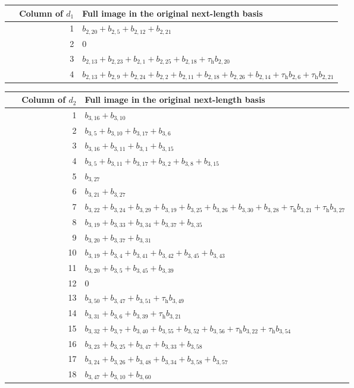 \begin{longtable}{r p{0.78\linewidth}}
Column of $d_1$ & Full image in the original next-length basis\\\hline
\endhead
1 & $b_{2,20} + b_{2,5} + b_{2,12} + b_{2,21}$\\
2 & $0$\\
3 & $b_{2,13} + b_{2,23} + b_{2,1} + b_{2,25} + b_{2,18} + \tau_{\mathrm h}b_{2,20}$\\
4 & $b_{2,13} + b_{2,9} + b_{2,24} + b_{2,2} + b_{2,11} + b_{2,18} + b_{2,26} + b_{2,14} + \tau_{\mathrm h}b_{2,6} + \tau_{\mathrm h}b_{2,21}$\\
\end{longtable}
\begin{longtable}{r p{0.78\linewidth}}
Column of $d_2$ & Full image in the original next-length basis\\\hline
\endhead
1 & $b_{3,16} + b_{3,10}$\\
2 & $b_{3,5} + b_{3,10} + b_{3,17} + b_{3,6}$\\
3 & $b_{3,16} + b_{3,11} + b_{3,1} + b_{3,15}$\\
4 & $b_{3,5} + b_{3,11} + b_{3,17} + b_{3,2} + b_{3,8} + b_{3,15}$\\
5 & $b_{3,27}$\\
6 & $b_{3,21} + b_{3,27}$\\
7 & $b_{3,22} + b_{3,24} + b_{3,29} + b_{3,19} + b_{3,25} + b_{3,26} + b_{3,30} + b_{3,28} + \tau_{\mathrm h}b_{3,21} + \tau_{\mathrm h}b_{3,27}$\\
8 & $b_{3,19} + b_{3,33} + b_{3,34} + b_{3,37} + b_{3,35}$\\
9 & $b_{3,20} + b_{3,37} + b_{3,31}$\\
10 & $b_{3,19} + b_{3,4} + b_{3,41} + b_{3,42} + b_{3,45} + b_{3,43}$\\
11 & $b_{3,20} + b_{3,5} + b_{3,45} + b_{3,39}$\\
12 & $0$\\
13 & $b_{3,50} + b_{3,47} + b_{3,51} + \tau_{\mathrm h}b_{3,49}$\\
14 & $b_{3,31} + b_{3,6} + b_{3,39} + \tau_{\mathrm h}b_{3,21}$\\
15 & $b_{3,32} + b_{3,7} + b_{3,40} + b_{3,55} + b_{3,52} + b_{3,56} + \tau_{\mathrm h}b_{3,22} + \tau_{\mathrm h}b_{3,54}$\\
16 & $b_{3,23} + b_{3,25} + b_{3,47} + b_{3,33} + b_{3,58}$\\
17 & $b_{3,24} + b_{3,26} + b_{3,48} + b_{3,34} + b_{3,58} + b_{3,57}$\\
18 & $b_{3,47} + b_{3,10} + b_{3,60}$\\

\end{longtable}

